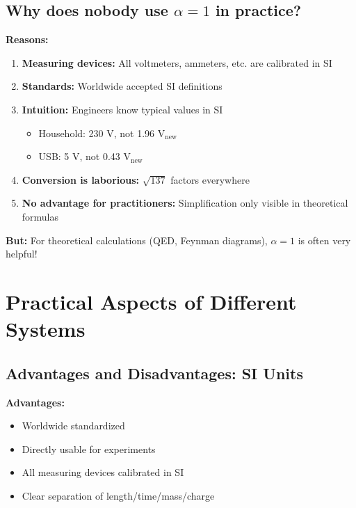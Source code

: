	\subsection{Why does nobody use $\alpha = 1$ in practice?}
	
	\textbf{Reasons:}
	\begin{enumerate}
		\item \textbf{Measuring devices:} All voltmeters, ammeters, etc. are calibrated in SI
		
		\item \textbf{Standards:} Worldwide accepted SI definitions
		
		\item \textbf{Intuition:} Engineers know typical values in SI
		\begin{itemize}
			\item Household: 230 V, not 1.96 V$_{\text{new}}$
			\item USB: 5 V, not 0.43 V$_{\text{new}}$
		\end{itemize}
		
		\item \textbf{Conversion is laborious:} $\sqrt{137}$ factors everywhere
		
		\item \textbf{No advantage for practitioners:} Simplification only visible in theoretical formulas
	\end{enumerate}
	
	\textbf{But:} For theoretical calculations (QED, Feynman diagrams), $\alpha = 1$ is often very helpful!
	
	\section{Practical Aspects of Different Systems}
	
	\subsection{Advantages and Disadvantages: SI Units}
	
	\textbf{Advantages:}
	\begin{itemize}
		\item Worldwide standardized
		\item Directly usable for experiments
		\item All measuring devices calibrated in SI
		\item Clear separation of length/time/mass/charge
	\end{itemize}
	
